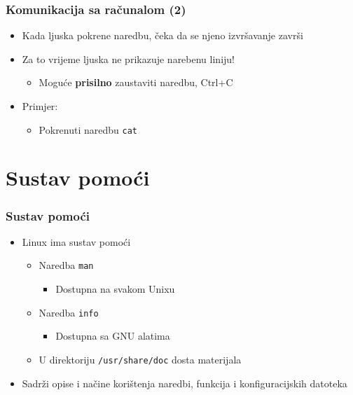 \documentclass{beamer}
\newcommand{\shell}[1]{\texttt{#1}}
\begin{document}
\begin{frame}[t]
\frametitle{Komunikacija sa računalom (2)}
\begin{itemize}
  \item Kada ljuska pokrene naredbu, čeka da se njeno izvršavanje
        završi
  \item Za to vrijeme ljuska ne prikazuje narebenu liniju!
  \begin{itemize}
    \item Moguće \textbf{prisilno} zaustaviti naredbu, Ctrl+C
  \end{itemize}
  \item Primjer:
  \begin{itemize}
    \item Pokrenuti naredbu \shell{cat}
  \end{itemize}
\end{itemize}
\end{frame}

\section{Sustav pomoći}
\begin{frame}[t]
\frametitle{Sustav pomoći}
\begin{itemize}
  \item Linux ima sustav pomoći
  \begin{itemize}
    \item Naredba \shell{man}
    \begin{itemize}
      \item Dostupna na svakom Unixu
    \end{itemize}
    \item Naredba \shell{info}
    \begin{itemize}
      \item Dostupna sa GNU alatima
    \end{itemize}
    \item U direktoriju \shell{/usr/share/doc} dosta materijala
  \end{itemize}
  \item Sadrži opise i načine korištenja naredbi, funkcija i
        konfiguracijskih datoteka
\end{itemize}
\end{frame}
\end{document}
